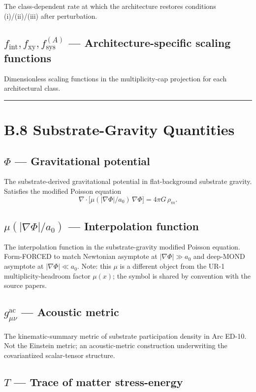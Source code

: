\documentclass[11pt]{book}
\begin{document}
The class-dependent rate at which the architecture restores conditions (i)/(ii)/(iii) after perturbation.

\subsection{$f_\mathrm{int}, f_\mathrm{xy}, f_\mathrm{sys}^{(A)}$ — Architecture-specific scaling functions}

Dimensionless scaling functions in the multiplicity-cap projection for each architectural class.

\bigskip\hrule\bigskip

\section{B.8 Substrate-Gravity Quantities}

\subsection{$\Phi$ — Gravitational potential}

The substrate-derived gravitational potential in flat-background substrate gravity. Satisfies the modified Poisson equation
\[
\nabla\cdot\big[\mu(|\nabla\Phi|/a_0)\,\nabla\Phi\big] = 4\pi G\,\rho_m.
\]

\subsection{$\mu(|\nabla\Phi|/a_0)$ — Interpolation function}

The interpolation function in the substrate-gravity modified Poisson equation. Form-FORCED to match Newtonian asymptote at $|\nabla\Phi|\gg a_0$ and deep-MOND asymptote at $|\nabla\Phi|\ll a_0$. Note: this $\mu$ is a different object from the UR-1 multiplicity-headroom factor $\mu(x)$; the symbol is shared by convention with the source papers.

\subsection{$g_{\mu\nu}^\mathrm{ac}$ — Acoustic metric}

The kinematic-summary metric of substrate participation density in Arc ED-10. Not the Einstein metric; an acoustic-metric construction underwriting the covariantized scalar-tensor structure.

\subsection{$T$ — Trace of matter stress-energy}
\end{document}
